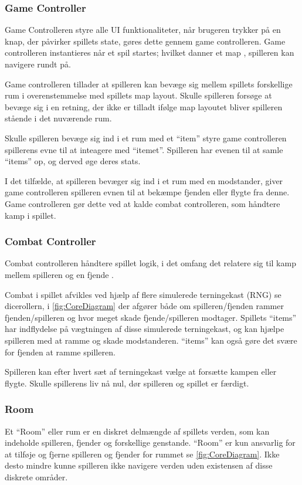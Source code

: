 \subsubsection{Game Controller}
Game Controlleren styre alle UI funktionaliteter, når brugeren
trykker på en knap, der påvirker spillets state, gøres dette
gennem game controlleren. Game controlleren instantieres når
et spil startes; hvilket danner et map \parencite[Section 10.3.1][]
{TekniskBilag}, spilleren kan navigere rundt på. 

Game controlleren tillader at spilleren kan bevæge sig mellem
spillets forskellige rum \parencite[Section 9.3.1][]{TekniskBilag} 
i overenstemmelse med spillets map layout. Skulle spilleren forsøge at
bevæge sig i en retning, der ikke er tilladt ifølge map layoutet bliver 
spilleren stående i det nuværende rum.

Skulle spilleren bevæge sig ind i et rum med et ``item'' styre 
game controlleren spillerens evne til at inteagere med ``itemet''.
Spilleren har evenen til at samle ``items'' op, og derved øge deres
stats.

I det tilfælde, at spilleren bevæger sig ind i et rum med en modstander,
giver game controlleren spilleren evnen til at bekæmpe fjenden eller
flygte fra denne. Game controlleren gør dette ved at kalde combat controlleren,
som håndtere kamp i spillet.

\subsubsection{Combat Controller}
Combat controlleren håndtere spillet logik, i det omfang det relatere sig til
kamp mellem spilleren og en fjende \parencite[Section 9.3.3][Figur 17]{TekniskBilag}.

\noindent Combat i spillet afvikles ved hjælp af flere simulerede terningekast (RNG) se dicerollern,
i \autoref{fig:CoreDiagram} der afgører både om spilleren/fjenden rammer fjenden/spilleren 
og hvor meget skade fjende/spilleren modtager. Spillets ``items'' har indflydelse
på vægtningen af disse simulerede terningekast, og kan hjælpe spilleren med at ramme og skade 
modstanderen. ``items'' kan også gøre det svære for fjenden at ramme spilleren.

Spilleren kan efter hvert sæt af terningekast vælge at forsætte kampen eller
flygte. Skulle spillerens liv nå nul, dør spilleren og spillet er færdigt.

\subsubsection{Room}
Et ``Room'' eller rum er en diskret delmængde af spillets verden, som kan indeholde
spilleren, fjender og forskellige genstande. ``Room'' er kun ansvarlig for at tilføje
og fjerne spilleren og fjender for rummet se \autoref{fig:CoreDiagram}. Ikke desto mindre
kunne spilleren ikke navigere verden uden existensen af disse diskrete områder.

